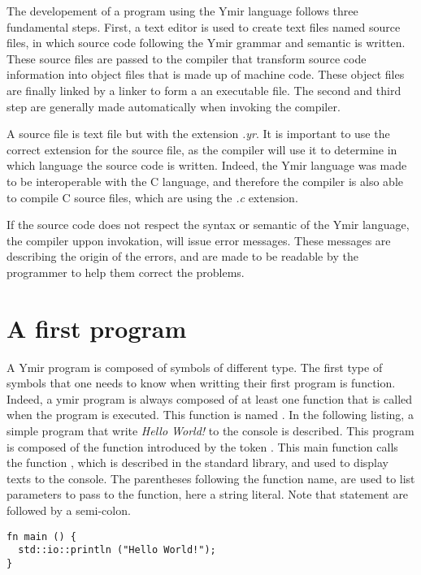 The developement of a program using the Ymir language follows three fundamental
steps. First, a text editor is used to create text files named source files, in
which source code following the Ymir grammar and semantic is written. These
source files are passed to the compiler that transform source code information
into object files that is made up of machine code. These object files are
finally linked by a linker to form a an executable file. The second and third
step are generally made automatically when invoking the compiler.

A source file is text file but with the extension \textit{.yr}. It is important
to use the correct extension for the source file, as the compiler will use it to
determine in which language the source code is written. Indeed, the Ymir
language was made to be interoperable with the C language, and therefore the
compiler is also able to compile C source files, which are using the \textit{.c}
extension.

If the source code does not respect the syntax or semantic of the Ymir language,
the compiler uppon invokation, will issue error messages. These messages are
describing the origin of the errors, and are made to be readable by the
programmer to help them correct the problems.

\section{A first program}

A Ymir program is composed of symbols of different type. The first type of
symbols that one needs to know when writting their first program is function.
Indeed, a ymir program is always composed of at least one function that is
called when the program is executed. This function is named . In the
following listing, a simple program that write \textit{Hello World!} to the
console is described. This program is composed of the function 
introduced by the token . This main function calls the function
, which is described in the standard library, and used
to display texts to the console. The parentheses following the 
function name, are used to list parameters to pass to the function, here a
string literal. Note that statement are followed by a semi-colon.

\begin{lstlisting}[style=coloredverbatim, caption=Source file \textit{hello.yr}]
fn main () {
  std::io::println ("Hello World!");
}
\end{lstlisting}


